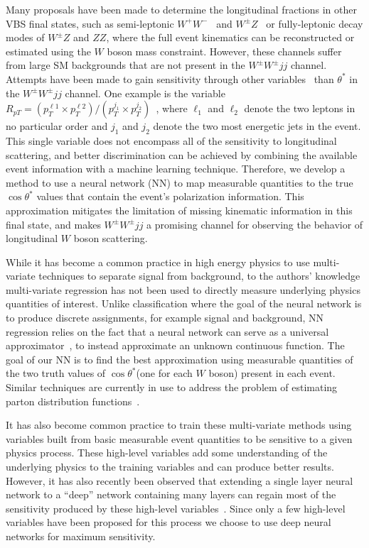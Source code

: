 \documentclass[aps,prl,twocolumn,showpacs,superscriptaddress,groupeaddress,floatfix]{revtex4}
\def\ssWW{\ensuremath{ W^{\pm}W^{\pm}jj }\xspace}
\def\ts{\ensuremath{ \theta^{*} }\xspace}
\def\cts{\ensuremath{ \cos\ts }\xspace}
\begin{document}
Many proposals have been made to determine the longitudinal fractions in other VBS final states, such as semi-leptonic
$W^+W^-$~\cite{Han:2009em} and $W^\pm Z$~\cite{VBSCuts1} or
fully-leptonic decay modes of $W^\pm Z$ and $ZZ$, where the full
event kinematics can be reconstructed or estimated using the $W$ boson mass constraint. 
However, these channels suffer from large SM backgrounds that are not present in the \ssWW channel. Attempts have been made 
to gain sensitivity through other variables~\cite{SSC_1,VBSCuts1,VBSME,Doroba:2012pd,new_VBS_warsaw_cut} than \ts in the \ssWW
channel. One example is the variable $R_{pT}=(p_{T}^{\ell 1} \times
p_{T}^{\ell 2}) / (p_T^{j_1} \times p_T^{j_2})$~\cite{Doroba:2012pd},
where $\ell_1$ and $\ell_2$ denote the two leptons in no particular
order and $j_1$ and $j_2$ denote the two most energetic jets in the
event. This single variable does not encompass all of the
sensitivity to longitudinal scattering, and better discrimination can
be achieved by combining the available event information with a
machine learning technique. Therefore, we develop a method to use a
neural network (NN) to map measurable quantities to the true \cts values
that contain the event's polarization information. This
approximation mitigates the limitation of missing kinematic information
in this final state, and makes \ssWW a promising channel for observing
the behavior of longitudinal $W$ boson scattering.
 

While it has become a common practice in high energy physics to use
multi-variate techniques to separate signal from background, to the
authors' knowledge multi-variate regression has not been used to
directly measure underlying physics quantities of interest. Unlike
classification where the goal of the neural network is to produce
discrete assignments, for example signal and background, NN regression
relies on the fact that a neural network can serve as a universal
approximator~\cite{NN_1}, to instead approximate an unknown continuous
function.  The goal of our NN is to find the best
approximation using measurable quantities of the two truth values
of \cts (one for each $W$ boson) present in each event. Similar
techniques are currently in use to address the problem of estimating
parton distribution functions~\cite{NNPDF}.

It has also become common practice to train these multi-variate
methods using variables built from basic measurable event quantities
to be sensitive to a given physics process. These high-level variables
add some understanding of the underlying physics to the training
variables and can produce better results. However, it has also
recently been observed that extending a single layer neural network to
a ``deep'' network containing many layers can regain most of the
sensitivity produced by these high-level
variables~\cite{Baldi:2014kfa,Baldi:2014pta}. Since only a few
high-level variables have been proposed for this process we choose to
use deep neural networks for maximum sensitivity.
\end{document}
